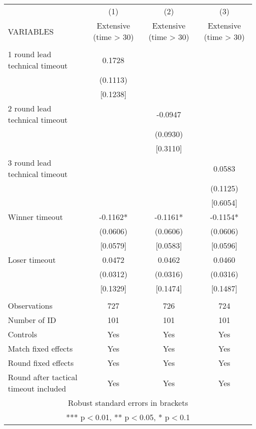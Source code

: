 \documentclass[]{article}
\begin{document}
\begin{tabular}{lccc} \hline
 & (1) & (2) & (3) \\
VARIABLES & Extensive (time > 30) & Extensive (time > 30) & Extensive (time > 30) \\ \hline
 &  &  &  \\
1 round lead technical timeout & 0.1728 &  &  \\
 & (0.1113) &  &  \\
 & [0.1238] &  &  \\
2 round lead technical timeout &  & -0.0947 &  \\
 &  & (0.0930) &  \\
 &  & [0.3110] &  \\
3 round lead technical timeout &  &  & 0.0583 \\
 &  &  & (0.1125) \\
 &  &  & [0.6054] \\
Winner timeout & -0.1162* & -0.1161* & -0.1154* \\
 & (0.0606) & (0.0606) & (0.0606) \\
 & [0.0579] & [0.0583] & [0.0596] \\
Loser timeout & 0.0472 & 0.0462 & 0.0460 \\
 & (0.0312) & (0.0316) & (0.0316) \\
 & [0.1329] & [0.1474] & [0.1487] \\
 &  &  &  \\
Observations & 727 & 726 & 724 \\
Number of ID & 101 & 101 & 101 \\
Controls & Yes & Yes & Yes \\
Match fixed effects & Yes & Yes & Yes \\
Round fixed effects & Yes & Yes & Yes \\
 Round after tactical timeout included & Yes & Yes & Yes \\ \hline
\multicolumn{4}{c}{ Robust standard errors in brackets} \\
\multicolumn{4}{c}{ *** p$<$0.01, ** p$<$0.05, * p$<$0.1} \\
\end{tabular}
\end{document}
